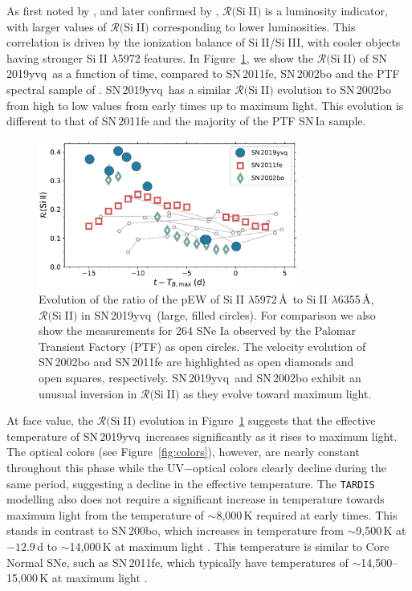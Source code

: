 \documentclass[twocolumn]{aastex63}
\def\ion#1#2{#1$\;${\footnotesize\rm{#2}}\relax}
\newcommand{\sn}{SN\,2019yvq}
\begin{document}
As first noted by \citet{Nugent95}, and later confirmed by
\citet{Hachinger08}, $\mathcal{R}($\ion{Si}{II}$)$ is a luminosity indicator,
with larger values of $\mathcal{R}($\ion{Si}{II}$)$ corresponding to lower
luminosities. This correlation is driven by the ionization balance of
\ion{Si}{II}/\ion{Si}{III}, with cooler objects having stronger \ion{Si}{II}
$\lambda$5972 features. In Figure~\ref{fig:r_evo}, we show the
$\mathcal{R}($\ion{Si}{II}$)$ of \sn\ as a function of time, compared to
SN\,2011fe, SN\,2002bo and the PTF spectral sample of \citet{Maguire14}. \sn\
has a similar $\mathcal{R}($\ion{Si}{II}$)$ evolution to SN\,2002bo from high
to low values from early times up to maximum light. This evolution is
different to that of SN\,2011fe and the majority of the PTF SN\,Ia sample.

\begin{figure}
    \centering
    \includegraphics[width=3.35in]{./figures/R_evolution.pdf}
    \caption{Evolution of the ratio of the pEW of \ion{Si}{II}
    $\lambda$5972\,\AA\ to \ion{Si}{II} $\lambda$6355\,\AA,
    $\mathcal{R}($\ion{Si}{II}$)$ in \sn\ (large, filled circles). For
    comparison we also show the measurements for 264 SNe Ia observed by the
    Palomar Transient Factory (PTF) as open circles. The velocity evolution
    of SN\,2002bo and SN\,2011fe are highlighted as open diamonds and open
    squares, respectively. \sn\ and SN\,2002bo exhibit an unusual inversion
    in $\mathcal{R}($\ion{Si}{II}$)$ as they evolve toward maximum light.}
    \label{fig:r_evo}
\end{figure}

At face value, the $\mathcal{R}($\ion{Si}{II}$)$ evolution in
Figure~\ref{fig:r_evo} suggests that the effective temperature of \sn\
increases significantly as it rises to maximum light. The optical colors (see
Figure~\ref{fig:colors}), however, are nearly constant throughout this phase
while the UV$ - $optical colors clearly decline during the same period,
suggesting a decline in the effective temperature. The \texttt{TARDIS}
modelling also does not require a significant increase in temperature towards
maximum light from the temperature of $\sim$8,000\,K required at early times.
This stands in contrast to SN\,200bo, which increases in temperature from
$\sim$9,500\,K at $-12.9$\,d to $\sim$14,000\,K at maximum light
\citep{Stehle05}. This temperature is similar to \citeauthor{Branch06} Core
Normal SNe, such as SN\,2011fe, which typically have temperatures of
$\sim$14,500--15,000\,K at maximum light \citep{Mazzali14}.
\end{document}
